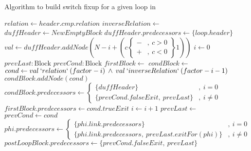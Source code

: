 \begin{algorithm}
    \caption{Algorithm to build switch fixup for a given loop in \libFIRM}
    \label{alg:impl:fixup:duff:create-fixup}
    \begin{algorithmic}
                \State {}
            \EndFor
                    \State {} 
                \EndIf
            \EndFor
            \State $relation \gets header.cmp.relation$
            \State $inverseRelation \gets $ 
            \State $duffHeader \gets NewEmptyBlock$
            \State $duffHeader.predecessors \gets \{loop.header\}$
            \State $val \gets duffHeader.addNode(N - i + (c
                \left\{\!\begin{aligned}
                   - &, \medspace c > 0\\
                   + &, \medspace c < 0
                \end{aligned}\right\} 1)
            )$
            \State $i \gets 0$
            \State $prevLast: \text{Block}$
            \State $prevCond: \text{Block}$
                \State $firstBlock \gets$ 
                \State $condBlock \gets$ 
                \State $cond \gets val \medspace `relation` \medspace (factor - i) \medspace \wedge \medspace val \medspace `inverseRelation` \medspace (factor - i - 1)$
                \State $condBlock.addNode(cond)$
                \State $condBlock.predecessors \gets \begin{cases}\{duffHeader\} &, \medspace i = 0\\ \{prevCond.falseExit, \medspace prevLast\} &, \medspace i \neq 0\end{cases}$
                \State $firstBlock.predecessors \gets cond.trueExit$
                \State $i \gets i + 1$
                \State $prevLast \gets$ 
                \State $prevCond \gets cond$
                    \State $phi.predecessors \gets \begin{cases}\{phi.link.predecessors\} &, \medspace i = 0\\ \{phi.link.predecessors, \medspace prevLast.exitFor(phi)\} &, \medspace i \neq 0\end{cases}$
                \EndFor
            \EndFor
                    \State {}
                \EndIf
            \EndFor
            \State $postLoopBlock.predecessors \gets \{prevCond.falseExit, \medspace prevLast\}$
            \State {} 
        \EndFunction
    \end{algorithmic}
\end{algorithm}
